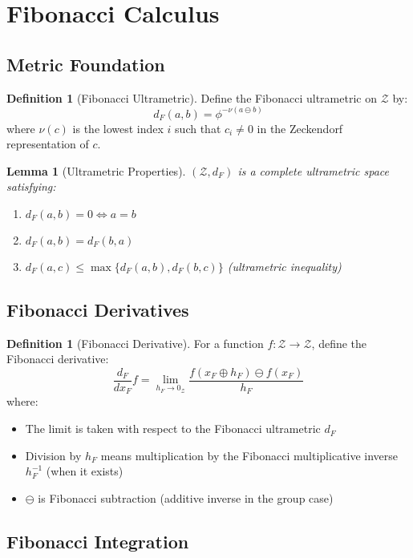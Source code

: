 \documentclass[12pt]{article}
\theoremstyle{plain}
\newtheorem{lemma}[theorem]{Lemma}
\theoremstyle{definition}
\newtheorem{definition}[theorem]{Definition}
\begin{document}
\section{Fibonacci Calculus}

\subsection{Metric Foundation}

\begin{definition}[Fibonacci Ultrametric]
Define the Fibonacci ultrametric on $\mathcal{Z}$ by:
$$d_F(a, b) = \phi^{-\nu(a \ominus b)}$$
where $\nu(c)$ is the lowest index $i$ such that $c_i \neq 0$ in the Zeckendorf representation of $c$.
\end{definition}

\begin{lemma}[Ultrametric Properties]
$(\mathcal{Z}, d_F)$ is a complete ultrametric space satisfying:
\begin{enumerate}
\item $d_F(a, b) = 0 \iff a = b$
\item $d_F(a, b) = d_F(b, a)$
\item $d_F(a, c) \leq \max\{d_F(a, b), d_F(b, c)\}$ (ultrametric inequality)
\end{enumerate}
\end{lemma}

\subsection{Fibonacci Derivatives}

\begin{definition}[Fibonacci Derivative]
For a function $f: \mathcal{Z} \to \mathcal{Z}$, define the Fibonacci derivative:
$$\frac{d_F}{dx_F} f = \lim_{h_F \to 0_\mathcal{Z}} \frac{f(x_F \oplus h_F) \ominus f(x_F)}{h_F}$$
where:
\begin{itemize}
\item The limit is taken with respect to the Fibonacci ultrametric $d_F$
\item Division by $h_F$ means multiplication by the Fibonacci multiplicative inverse $h_F^{-1}$ (when it exists)
\item $\ominus$ is Fibonacci subtraction (additive inverse in the group case)
\end{itemize}
\end{definition}

\subsection{Fibonacci Integration}
\end{document}
